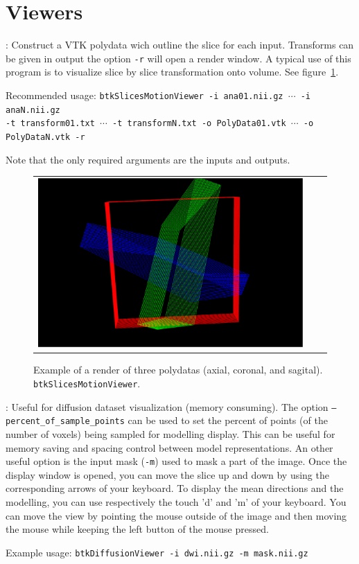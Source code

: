 \newpage
\section{Viewers}
\label{sec:viewers}

\begin{description}
\item[btkSlicesMotionViewer]: Construct a VTK polydata wich outline the slice for each input. Transforms can be given in output the option \texttt{-r} will open a render window.
A typical use of this program is to visualize slice by slice transformation onto volume. See figure~\ref{fig:btkSlicesMotionViewer}.

Recommended usage: \texttt{btkSlicesMotionViewer -i ana01.nii.gz $\cdots$ -i anaN.nii.gz \\
-t transform01.txt $\cdots$ -t transformN.txt -o PolyData01.vtk $\cdots$ -o PolyDataN.vtk -r }

Note that the only required arguments are the inputs and outputs.

\begin{figure}[t]
\centering
\begin{tabular}{ccc}
\includegraphics[width=0.5\columnwidth]{btkSlicesMotionViewer.eps}
\end{tabular}
\caption{Example of a render of three polydatas (axial, coronal, and sagital).
\texttt{btkSlicesMotionViewer}.}
\label{fig:btkSlicesMotionViewer}
\end{figure}

\item[btkDiffusionViewer]: Useful for diffusion dataset visualization (memory consuming). The option \texttt{--percent\_of\_sample\_points} can be used to set the percent of points (of the number of voxels) being sampled for modelling display. This can be useful for memory saving and spacing control between model representations. An other useful option is the input mask (\texttt{-m}) used to mask a part of the image.
Once the display window is opened, you can move the slice up and down by using the corresponding arrows of your keyboard. To display the mean directions and the modelling, you can use respectively the touch 'd' and 'm' of your keyboard. You can move the view by pointing the mouse outside of the image and then moving the mouse while keeping the left button of the mouse pressed.

Example usage: \texttt{btkDiffusionViewer -i dwi.nii.gz -m mask.nii.gz}

\end{description}

